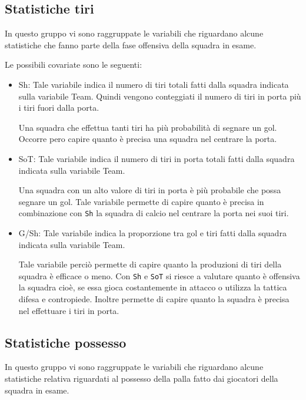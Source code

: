 \subsection{Statistiche tiri}

In questo gruppo vi sono raggruppate le variabili che riguardano alcune statistiche che fanno parte della fase offensiva della squadra in esame.

Le possibili covariate sono le seguenti:
\begin{itemize}
	
	\item \textsf{Sh}: Tale variabile indica il numero di tiri totali fatti dalla squadra indicata sulla variabile \textsf{Team}. Quindi vengono conteggiati il numero di tiri in porta più i tiri fuori dalla porta. 
	
	Una squadra che effettua tanti tiri ha più probabilità di segnare un gol. Occorre pero capire quanto è precisa una squadra nel centrare la porta.
	\item \textsf{SoT}: Tale variabile indica il numero di tiri in porta totali fatti dalla squadra indicata sulla variabile \textsf{Team}. 
	
	Una squadra con un alto valore di tiri in porta è più probabile che possa segnare un gol. Tale variabile permette di capire quanto è precisa in combinazione con \texttt{Sh} la squadra di calcio nel centrare la porta nei suoi tiri.
	\item \textsf{G/Sh}: Tale variabile indica la proporzione tra gol e tiri fatti dalla squadra indicata sulla variabile \textsf{Team}. 
	
	Tale variabile perciò permette di capire quanto la produzioni di tiri della squadra è efficace o meno. Con \texttt{Sh} e \texttt{SoT} si riesce a valutare quanto è offensiva la squadra cioè, se essa gioca costantemente in attacco o utilizza la tattica difesa e contropiede. Inoltre permette di capire quanto la squadra è precisa nel effettuare i tiri in porta.
\end{itemize}

\subsection{Statistiche possesso}

In questo gruppo vi sono raggruppate le variabili che riguardano alcune statistiche relativa riguardati al possesso della palla fatto dai giocatori della squadra in esame.

